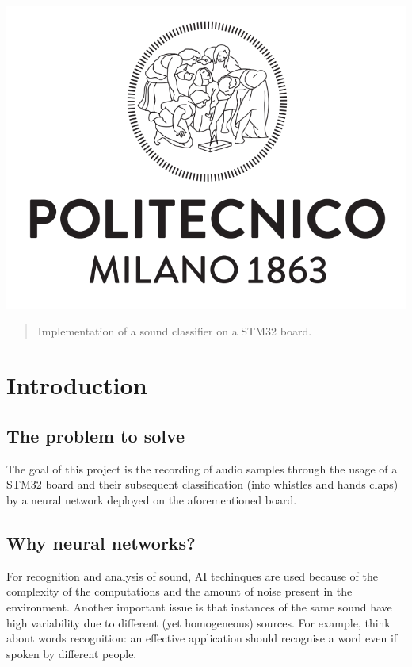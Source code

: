 \documentclass[12pt]{article}
\begin{document}
\begin{titlepage}
\begin{center}
	\includegraphics[scale=0.23]{img/Logo_Politecnico_Milano.png}                                               
\end{center}

\vfill

\end{titlepage}


\begin{abstract}
Implementation of a sound classifier on a STM32 board.
\end{abstract}

\section{Introduction}

\subsection{The problem to solve}
The goal of this project is the recording of audio samples through the usage of a STM32 board and their subsequent classification (into whistles and hands claps) by a neural network deployed on the aforementioned board.

\subsection{Why neural networks?}
For recognition and analysis of sound, AI techinques are used because of the complexity of the computations and the amount of noise present in the environment. Another important issue is that instances of the same sound have high variability due to different (yet homogeneous) sources. For example, think about words recognition: an effective application should recognise a word even if spoken by different people.
\end{document}
